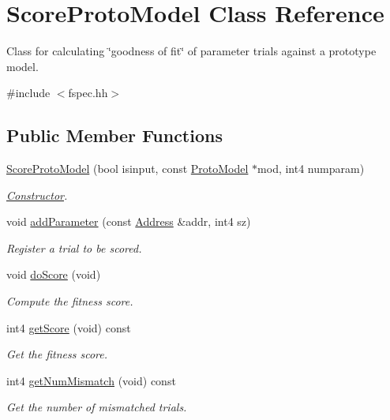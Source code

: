 \hypertarget{class_score_proto_model}{}\section{Score\+Proto\+Model Class Reference}
\label{class_score_proto_model}


Class for calculating \char`\"{}goodness of fit\char`\"{} of parameter trials against a prototype model.  




{\ttfamily \#include $<$fspec.\+hh$>$}

\subsection*{Public Member Functions}
\begin{DoxyCompactItemize}
\item 
\mbox{\hyperlink{class_score_proto_model_afb8e99caf8e9d51d6811b4fc482526e2}{Score\+Proto\+Model}} (bool isinput, const \mbox{\hyperlink{class_proto_model}{Proto\+Model}} $\ast$mod, int4 numparam)
\begin{DoxyCompactList}\small\item\em \mbox{\hyperlink{class_constructor}{Constructor}}. \end{DoxyCompactList}\item 
void \mbox{\hyperlink{class_score_proto_model_aac1568db9b3ebba5747ad8eba5f6438f}{add\+Parameter}} (const \mbox{\hyperlink{class_address}{Address}} \&addr, int4 sz)
\begin{DoxyCompactList}\small\item\em Register a trial to be scored. \end{DoxyCompactList}\item 
void \mbox{\hyperlink{class_score_proto_model_aae328b10f50c1f6526f503e0064d4749}{do\+Score}} (void)
\begin{DoxyCompactList}\small\item\em Compute the fitness score. \end{DoxyCompactList}\item 
int4 \mbox{\hyperlink{class_score_proto_model_a3dec47bf8f824704151759848f50ddc7}{get\+Score}} (void) const
\begin{DoxyCompactList}\small\item\em Get the fitness score. \end{DoxyCompactList}\item 
int4 \mbox{\hyperlink{class_score_proto_model_aeb55589e04d1f68f9bd2d2eebb4a5710}{get\+Num\+Mismatch}} (void) const
\begin{DoxyCompactList}\small\item\em Get the number of mismatched trials. \end{DoxyCompactList}\end{DoxyCompactItemize}


